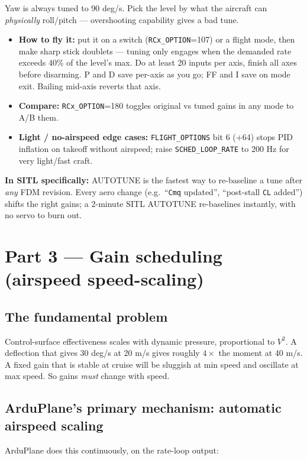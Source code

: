 \documentclass[11pt,a4paper]{article}
\newcommand{\pp}[1]{\texttt{#1}} %
\begin{document}
Yaw is always tuned to 90 deg/s. Pick the level by what the aircraft can
\emph{physically} roll/pitch --- overshooting capability gives a bad tune.

\begin{itemize}[leftmargin=1.4em]
  \item \textbf{How to fly it:} put it on a switch (\pp{RCx\_OPTION}=107) or a
  flight mode, then make sharp stick doublets --- tuning only engages when the
  demanded rate exceeds 40\% of the level's max. Do at least 20 inputs per axis,
  finish all axes before disarming. P and D save per-axis as you go; FF and I save
  on mode exit. Bailing mid-axis reverts that axis.
  \item \textbf{Compare:} \pp{RCx\_OPTION}=180 toggles original vs tuned gains in
  any mode to A/B them.
  \item \textbf{Light / no-airspeed edge cases:} \pp{FLIGHT\_OPTIONS} bit 6 (+64)
  stops PID inflation on takeoff without airspeed; raise \pp{SCHED\_LOOP\_RATE} to
  200 Hz for very light/fast craft.
\end{itemize}

\textbf{In SITL specifically:} AUTOTUNE is the fastest way to re-baseline a tune
after \emph{any} FDM revision. Every aero change (e.g.\ ``\pp{Cmq} updated'',
``post-stall \pp{CL} added'') shifts the right gains; a 2-minute SITL AUTOTUNE
re-baselines instantly, with no servo to burn out.

\section{Part 3 --- Gain scheduling (airspeed speed-scaling)}

\subsection{The fundamental problem}
Control-surface effectiveness scales with dynamic pressure, proportional to
$V^2$. A deflection that gives 30 deg/s at 20 m/s gives roughly $4\times$ the
moment at 40 m/s. A fixed gain that is stable at cruise will be sluggish at min
speed and oscillate at max speed. So gains \emph{must} change with speed.

\subsection{ArduPlane's primary mechanism: automatic airspeed scaling}
ArduPlane does this continuously, on the rate-loop output:
\end{document}
